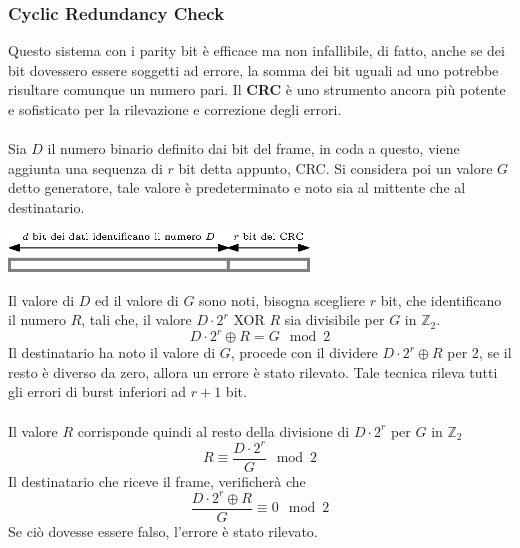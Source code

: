 \documentclass[12pt, letterpaper]{article}
\newcommand{\acc}{\\\hphantom{}\\}
\begin{document}
\subsubsection{Cyclic Redundancy Check}\label{CRC}
Questo sistema con i parity bit è efficace ma non infallibile, di fatto, anche se dei bit dovessero essere soggetti 
ad errore, la somma dei bit uguali ad uno potrebbe risultare comunque un numero pari.
Il \textbf{CRC} è uno strumento ancora più potente e sofisticato per la rilevazione e correzione degli errori.\acc 
Sia $D$ il numero binario definito dai bit del frame, in coda a questo, viene aggiunta una sequenza di $r$ 
bit detta appunto, CRC. Si considera poi un valore $G$ detto generatore, tale valore è predeterminato e noto sia al 
mittente che al destinatario.\begin{center}
    \includegraphics[width=0.6\textwidth ]{images/crcBit.eps}
\end{center} 
Il valore di $D$ ed il valore di $G$ sono noti, bisogna scegliere $r$ bit, che identificano il numero $R$, tali che, 
il valore $D\cdot 2^r$  XOR $R$ sia divisibile per $G$ in $\mathbb{Z}_2$.
$$ D\cdot 2^r \oplus R = G \mod{2}$$ 
Il destinatario ha noto il valore di $G$, procede con il dividere $D\cdot 2^r \oplus R$ per 2, se il resto è 
diverso da zero, allora un errore è stato rilevato. Tale tecnica rileva tutti gli errori di burst inferiori 
ad $r+1$ bit.\acc 
Il valore $R$ corrisponde quindi al resto della divisione di $D\cdot 2^r$ per $G$ in $\mathbb{Z}_2$ 
$$ R\equiv \dfrac{D\cdot 2^r}{G}\mod{2}$$
Il destinatario che riceve il frame, verificherà che $$\dfrac{D\cdot 2^r \oplus R}{G}\equiv 0 \mod{2} $$ 
Se ciò dovesse essere falso, l'errore è stato rilevato.
\end{document}
